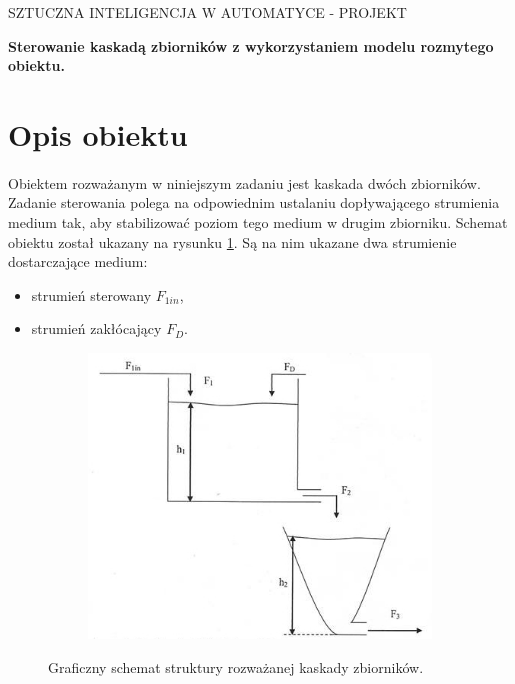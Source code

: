\documentclass[a4paper,12pt]{article}
\begin{document}
   \begin{center}
      \large{SZTUCZNA INTELIGENCJA W AUTOMATYCE - PROJEKT}
   \end{center}
   \vskip1cm

   \begin{center}
   \large{\textbf{Sterowanie kaskadą zbiorników z wykorzystaniem modelu rozmytego obiektu.}}
   \end{center}

   \newpage
   \thispagestyle{empty}
\tableofcontents


\newpage
\section{Opis obiektu}

\paragraph{}
Obiektem rozważanym w niniejszym zadaniu jest kaskada dwóch zbiorników. Zadanie sterowania polega na odpowiednim ustalaniu dopływającego strumienia medium tak, aby stabilizować poziom tego medium w drugim zbiorniku.
Schemat obiektu został ukazany na rysunku \ref{img:schemat}.
Są na nim ukazane dwa strumienie dostarczające medium:

\begin{itemize}
   \item strumień sterowany $F_{1in}$,
   \item strumień zakłócający $F_D$.
\end{itemize}

\begin{figure}[h]
   \centering
   \begin{subfigure}[h]{0.65\textwidth}
      \includegraphics[width=\textwidth]{img/schemat.jpg}
   \end{subfigure}
   \caption{Graficzny schemat struktury rozważanej kaskady zbiorników.}
   \label{img:schemat}
\end{figure}
\end{document}
